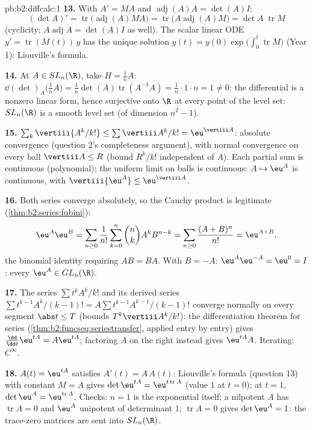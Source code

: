 \begin{solution}{pb:b2:diffcalc:1}
\textbf{13.} With $A' = MA$ and
$\operatorname{adj}(A)A = \det(A)I$:
\[
(\det A)' = \operatorname{tr}\bigl(\operatorname{adj}(A)MA
\bigr)
= \operatorname{tr}\bigl(A\operatorname{adj}(A)M\bigr)
= \det A\;\operatorname{tr}M
\]
(cyclicity; $A\operatorname{adj}A = \det(A) I$ as well). The
scalar linear ODE $y' = \operatorname{tr}(M(t))\,y$ has the
unique solution $y(t) = y(0)\exp\bigl(\int_0^t
\operatorname{tr}M\bigr)$ (Year 1): Liouville's formula.

\textbf{14.} At $A \in SL_n(\R)$, take $H = \frac1nA$:
$\dd(\det)_A\bigl(\tfrac1nA\bigr) = \frac1n\det(A)
\operatorname{tr}(A^{-1}A) = \frac1n\cdot1\cdot n = 1 \neq 0$:
the differential is a nonzero linear form, hence surjective
onto $\R$ at every point of the level set: $SL_n(\R)$ is a
smooth level set (of dimension $n^2 - 1$).

\textbf{15.} $\sum_k\vertiii{A^k/k!} \leq
\sum\vertiii A^k/k! = \eu^{\vertiii A}$: absolute convergence
(question 2's completeness argument), with normal convergence
on every ball $\vertiii A \leq R$ (bound $R^k/k!$ independent
of $A$). Each partial sum is continuous (polynomial); the
uniform limit on balls is continuous: $A \mapsto \eu^A$ is
continuous, with $\vertiii{\eu^A} \leq \eu^{\vertiii A}$.

\textbf{16.} Both series converge absolutely, so the Cauchy
product is legitimate (\cref{thm:b2:series:fubini}):
\[
\eu^A\eu^B = \sum_{n\geq0}\frac{1}{n!}\sum_{k=0}^n\binom
nkA^kB^{n-k}
= \sum_{n\geq0}\frac{(A+B)^n}{n!} = \eu^{A+B},
\]
the binomial identity requiring $AB = BA$. With $B = -A$:
$\eu^A\eu^{-A} = \eu^0 = I$: every $\eu^A \in GL_n(\R)$.

\textbf{17.} The series $\sum t^kA^k/k!$ and its derived series
$\sum t^{k-1}A^k/(k-1)! = A\sum t^{k-1}A^{k-1}/(k-1)!$ converge
normally on every segment $\abs t \leq T$ (bounds
$T^k\vertiii A^k/k!$): the differentiation theorem for series
(\cref{thm:b2:funcseq:seriestransfer}, applied entry by entry)
gives $\frac{\dd}{\dd t}\eu^{tA} = A\eu^{tA}$; factoring $A$
on the right instead gives $\eu^{tA}A$. Iterating: $C^\infty$.

\textbf{18.} $A(t) = \eu^{tA}$ satisfies $A'(t) = A\,A(t)$:
Liouville's formula (question 13) with constant $M = A$ gives
$\det\eu^{tA} = \eu^{t\operatorname{tr}A}$ (value $1$ at $t =
0$); at $t = 1$, $\det\eu^A = \eu^{\operatorname{tr}A}$.
Checks: $n = 1$ is the exponential itself; a nilpotent $A$ has
$\operatorname{tr}A = 0$ and $\eu^A$ unipotent of determinant
$1$; $\operatorname{tr}A = 0$ gives $\det\eu^A = 1$: the
trace-zero matrices are sent into $SL_n(\R)$.


\end{solution}

